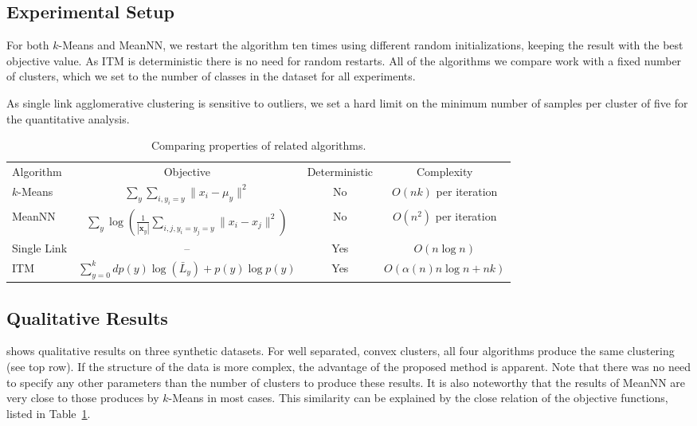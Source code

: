 \subsection{Experimental Setup}
For both $k$-Means and MeanNN, we restart the algorithm ten times using
different random initializations, keeping the result with the best objective
value. As ITM is deterministic there is no need for random restarts.  All of
the algorithms we compare work with a fixed number of clusters, which we set to
the number of classes in the dataset for all experiments.

As single link agglomerative clustering is sensitive to outliers, we set
a hard limit on the minimum number of samples per cluster of five for
the quantitative analysis.

\begin{table}[t]
\centering
\begin{tabularx}{\linewidth}{@{\extracolsep{\fill}}lccc}
\toprule
Algorithm &     Objective &     Deterministic&      Complexity \\
\cmidrule{1-4}
$k$-Means &     $\displaystyle \sum_y \sum_{i, y_i = y} \| x_i - \mu_y \|^2$ & No  & $O(nk)$ per iteration%
\\
MeanNN &    $\displaystyle \sum_y \log\left(\frac{1}{|\mathbf{x}_y|}\sum_{i,j, y_i=y_j=y} \| x_i - x_j \|^2 \right)$ & No & $O(n^2)$ per iteration\\
Single Link &   -- &    Yes    &    $O(n\log n)$\\
ITM & $\displaystyle \sum_{y=0}^k d p(y) \log(\bar{L}_y  ) + p(y) \log{p(y)}$ & Yes & $O(\alpha(n) n \log n + nk)$\\
\bottomrule
\end{tabularx}
\caption{Comparing properties of related algorithms.}\label{nowotab}
\end{table}


\subsection{Qualitative Results}
 shows qualitative results on three synthetic datasets.
For well separated, convex clusters, all four algorithms produce the same
clustering (see top row).  If the structure of the data is more complex, the
advantage of the proposed method is apparent.  Note that there was no need to
specify any other parameters than the number of clusters to produce these
results.  It is also noteworthy that the results of MeanNN are very close to
those produces by $k$-Means in most cases. This similarity can be explained
by the close relation of the objective functions, listed in Table~\ref{nowotab}.

